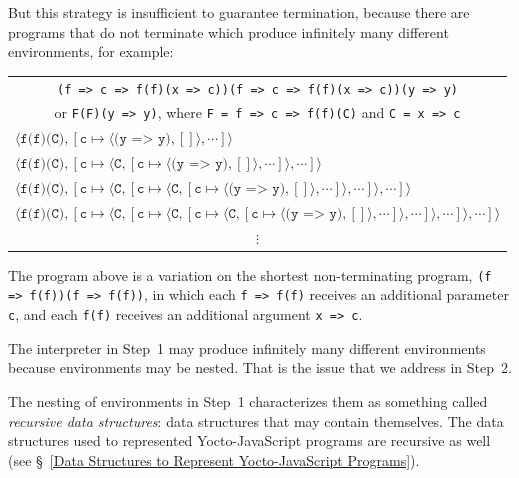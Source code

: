 \documentclass[12pt, oneside]{book}
\begin{document}
But this strategy is insufficient to guarantee termination, because there are programs that do not terminate which produce infinitely many different environments, for example:

\begin{center}
\begin{tabular}{l}
\multicolumn{1}{c}{\texttt{(f => c => f(f)(x => c))(f => c => f(f)(x => c))(y => y)}} \\
\multicolumn{1}{c}{or \texttt{F(F)(y => y)}, where \texttt{F = f => c => f(f)(C)} and \texttt{C = x => c}} \\
$\langle \texttt{f(f)(C)}, [\texttt{c} \mapsto \langle \texttt{(y => y)}, [] \rangle, \cdots] \rangle$ \\
$\langle \texttt{f(f)(C)}, [\texttt{c} \mapsto \langle \texttt{C}, [\texttt{c} \mapsto \langle \texttt{(y => y)}, [] \rangle, \cdots] \rangle, \cdots] \rangle$ \\
$\langle \texttt{f(f)(C)}, [\texttt{c} \mapsto \langle \texttt{C}, [\texttt{c} \mapsto \langle \texttt{C}, [\texttt{c} \mapsto \langle \texttt{(y => y)}, [] \rangle, \cdots] \rangle, \cdots] \rangle, \cdots] \rangle$ \\
$\langle \texttt{f(f)(C)}, [\texttt{c} \mapsto \langle \texttt{C}, [\texttt{c} \mapsto \langle \texttt{C}, [\texttt{c} \mapsto \langle \texttt{C}, [\texttt{c} \mapsto \langle \texttt{(y => y)}, [] \rangle, \cdots] \rangle, \cdots] \rangle, \cdots] \rangle, \cdots] \rangle$ \\
\multicolumn{1}{c}{$\vdots$} \\
\end{tabular}
\end{center}

The program above is a variation on the shortest non-terminating program, \texttt{(f => f(f))(f => f(f))}, in which each \texttt{f => f(f)} receives an additional parameter \texttt{c}, and each \texttt{f(f)} receives an additional argument \texttt{x => c}.

The interpreter in Step~1 may produce infinitely many different environments because environments may be nested. That is the issue that we address in Step~2.

\begin{mdframed}[frametitle = {Technical Terms}]
The nesting of environments in Step~1 characterizes them as something called \emph{recursive data structures}: data structures that may contain themselves. The data structures used to represented Yocto-JavaScript programs are recursive as well (see §~\ref{Data Structures to Represent Yocto-JavaScript Programs}).
\end{mdframed}
\end{document}
